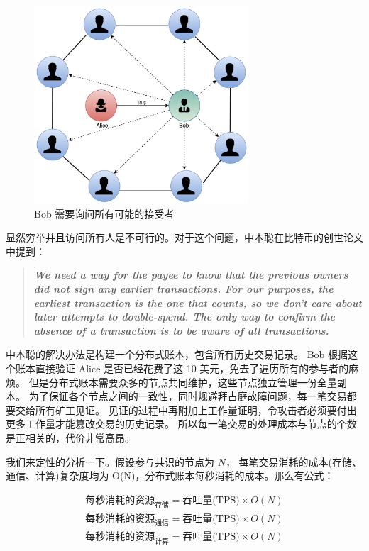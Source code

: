 \begin{figure}[h!]
    \centering
    \includegraphics[width=8cm, keepaspectratio]{../images/Gossip.png}
    \caption{Bob 需要询问所有可能的接受者}
    \label{fig:gossip}
\end{figure}
\newpage
显然穷举并且访问所有人是不可行的。对于这个问题，中本聪在比特币的创世论文中提到：

\begin{quote}
    \textbf{\textit{We need a way for the payee to know that the previous owners did not sign any earlier transactions. 
            For our purposes, the earliest transaction is the one that counts, so we don't care about later attempts to double-spend. 
            The only way to confirm the absence of a transaction is to be aware of all transactions.}}
\end{quote}

中本聪的解决办法是构建一个分布式账本，包含所有历史交易记录。
Bob 根据这个账本直接验证 Alice 是否已经花费了这 10 美元，免去了遍历所有的参与者的麻烦。
但是分布式账本需要众多的节点共同维护，这些节点独立管理一份全量副本。
为了保证各个节点之间的一致性，同时规避拜占庭故障问题，每一笔交易都要交给所有矿工见证。
见证的过程中再附加上工作量证明，令攻击者必须要付出更多工作量才能篡改交易的历史记录。
所以每一笔交易的处理成本与节点的个数是正相关的，代价非常高昂。

我们来定性的分析一下。假设参与共识的节点为 $N$，
每笔交易消耗的成本(存储、通信、计算)复杂度均为 O(N)，分布式账本每秒消耗的成本。那么有公式：

\begin{gather}\label{equ:cost}
\text{每秒消耗的资源}_\text{存储} = \text{吞吐量(TPS)} \times O(N) \\
\text{每秒消耗的资源}_\text{通信} = \text{吞吐量(TPS)} \times O(N) \\
\text{每秒消耗的资源}_\text{计算} = \text{吞吐量(TPS)} \times O(N) 
\end{gather}

